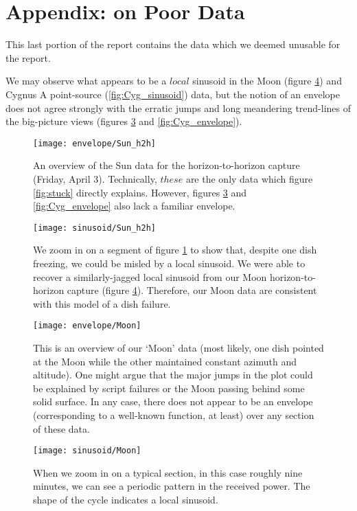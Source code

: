 \documentclass[12pt]{article}
\begin{document}
\section{Appendix: on Poor Data}

\quad \quad This last portion of the report contains the data which we deemed unusable for the report.

We may observe what appears to be a $local$ sinusoid in the Moon (figure \ref{fig:Moon_sinusoid}) and Cygnus A point-source (\ref{fig:Cyg_sinusoid}) data, but the notion of an envelope does not agree strongly with the erratic jumps and long meandering trend-lines of the big-picture views (figures \ref{fig:Moon_envelope} and \ref{fig:Cyg_envelope}).

\begin{figure}
	\centering
	\texttt{[image: envelope/Sun\_h2h]}
	\caption{An overview of the Sun data for the horizon-to-horizon capture (Friday, April 3). Technically, $these$ are the only data which figure \ref{fig:stuck} directly explains. However, figures \ref{fig:Moon_envelope} and \ref{fig:Cyg_envelope} also lack a familiar envelope.}
	\label{fig:Sun_h2h_envelope}
\end{figure}

\begin{figure}
	\centering
	\texttt{[image: sinusoid/Sun\_h2h]}
	\caption{We zoom in on a segment of figure \ref{fig:Sun_h2h_envelope} to show that, despite one dish freezing, we could be misled by a local sinusoid. We were able to recover a similarly-jagged local sinusoid from our Moon horizon-to-horizon capture (figure \ref{fig:Moon_sinusoid}). Therefore, our Moon data are consistent with this model of a dish failure.}
	\label{fig:Sun_h2h_sinusoid}
\end{figure}

\begin{figure}
	\centering
	\texttt{[image: envelope/Moon]}
	\caption{This is an overview of our `Moon' data (most likely, one dish pointed at the Moon while the other maintained constant azimuth and altitude). One might argue that the major jumps in the plot could be explained by script failures or the Moon passing behind some solid surface. In any case, there does not appear to be an envelope (corresponding to a well-known function, at least) over any section of these data.}
	\label{fig:Moon_envelope}
\end{figure}

\begin{figure}
	\centering
	\texttt{[image: sinusoid/Moon]}
	\caption{When we zoom in on a typical section, in this case roughly nine minutes, we can see a periodic pattern in the received power. The shape of the cycle indicates a local sinusoid.}
	\label{fig:Moon_sinusoid}
\end{figure}
\end{document}
